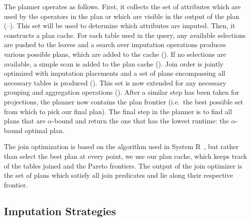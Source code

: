 The planner operates as follows.
First, it collects the set of attributes which are used by the operators in the plan or which are visible in the output of the plan (--).
This set will be used to determine which attributes are imputed.
Then, it constructs a plan cache. For each table used in the query, any available selections are pushed to the leaves and
a search over imputation operations produces various possible plans, which are added to the cache (). If no selections are available, a 
simple scan is added to the plan cache (). Join order is jointly optimized with imputation placements and a set of
plans encompassing all necessary tables is produced (). This set is now extended for any necessary grouping and aggregation
operations (). After a similar step has been taken for projections, the planner now contains the plan frontier (i.e.\ the
best possible set from which to pick our final plan). The final step in the planner is to find all plans that are
$\alpha$-bound and return the one that has the lowest runtime: the $\alpha$-bound optimal plan.

The join optimization is based on the algorithm used in System R~\cite{blasgen1981system},
but rather than select the best plan at every point, we use our plan cache, which keeps track of the tables joined and the Pareto frontiers.
The output of the join optimizer is the set of plans which satisfy all join predicates and lie along their respective frontier.

\begin{algorithm}

\end{algorithm}

\begin{algorithm}

\end{algorithm}

%

\begin{algorithm}

\end{algorithm}



\subsection{Imputation Strategies}
\label{sec:imputation}

